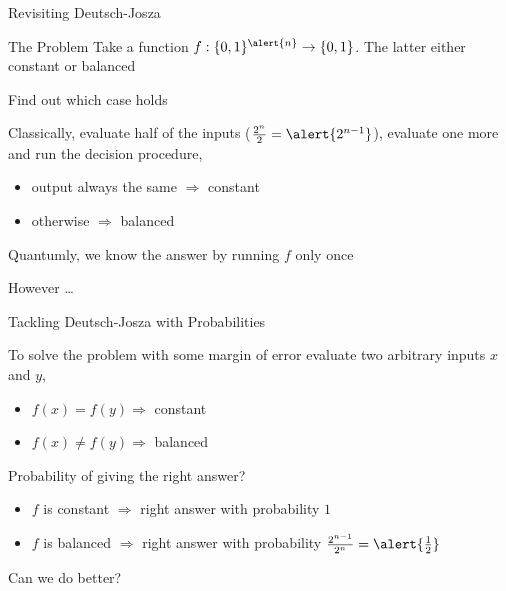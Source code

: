 \documentclass{beamer}
\begin{document}
\begin{frame}{Revisiting Deutsch-Josza}
        \begin{block}{The Problem}
                Take a function $f : \{0,1\}^{\alert{n}} \to \{0,1\}$.
                The latter  either constant or balanced

                Find out which case holds
        \end{block}
        
        Classically, evaluate half of the inputs ($\frac{2^{n}}{2} = \alert{2^{n-1}}$),
        evaluate one more and run the decision procedure,
        \begin{itemize}
                \item output always the same $\Longrightarrow$ constant
                \item otherwise $\Longrightarrow$ balanced
        \end{itemize}

        Quantumly, we know the answer by running $f$ only \alert{once}

        \pause
        However \dots
\end{frame}

\begin{frame}{Tackling Deutsch-Josza with Probabilities}

        To solve the problem with \alert{some margin of error} evaluate
        two \alert{arbitrary} inputs $x$ and $y$,
        \begin{itemize}
                \item $f(x) = f(y) \Longrightarrow$ constant
                \item $f(x) \not = f(y) \Longrightarrow$ balanced
        \end{itemize}
        \pause
        Probability of giving the right answer?

        \pause
        \begin{itemize}
                \item $f$ is constant $\Longrightarrow$ right answer
                        with probability $1$ 
                \item $f$ is balanced $\Longrightarrow$ right answer with probability
                        $\frac{2^{n-1}}{2^n} = \alert{\frac{1}{2}}$
        \end{itemize}

        \pause
        Can we do better?
\end{frame}
\end{document}
